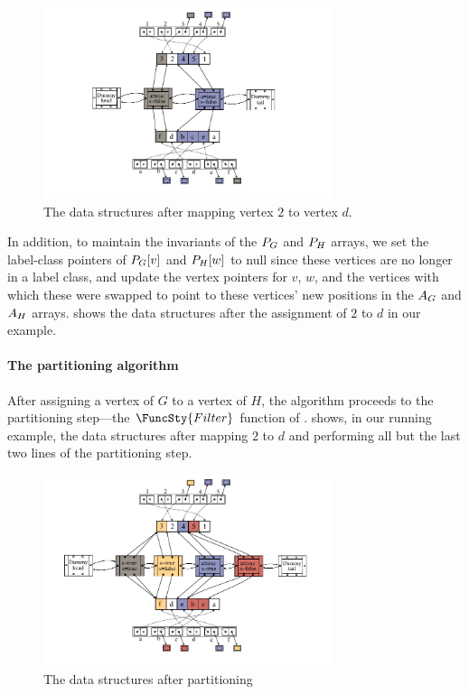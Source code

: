 \begin{figure}[htb]
    \centering
    \includegraphics*[width=0.75\textwidth]{14b-mcsplit-induced-si/figs/data-structure-step-2}
    \caption{The data structures after mapping vertex $2$ to vertex $d$.}
    \label{figure:si-data-structures-2}
\end{figure}

In addition, to maintain the invariants of
the $P_G$ and $P_H$ arrays, we set the label-class pointers of
$P_G[v]$ and $P_H[w]$ to null since these vertices
are no longer in a label class, and update the vertex pointers
for $v$, $w$, and the vertices with which these were swapped to point to these
vertices' new positions in the $A_G$ and $A_H$ arrays.
 shows the data structures after the assignment
of $2$ to $d$ in our example.

\FloatBarrier

\paragraph{The partitioning algorithm}
After assigning a vertex of $G$ to a vertex of $H$, the algorithm proceeds to the partitioning
step---the $\FuncSty{Filter}$ function of .
 shows, in our running example,
the data structures after mapping $2$ to $d$ and performing all but the last
two lines of the partitioning step.

\begin{figure}[htb]
    \centering
    \includegraphics*[width=0.75\textwidth]{14b-mcsplit-induced-si/figs/data-structure-step-3}
    \caption{The data structures after partitioning}
    \label{figure:si-data-structures-3}
\end{figure}

